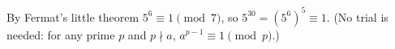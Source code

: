 By Fermat's little theorem $5^6\equiv1\pmod7$, so $5^{30}=(5^6)^5\equiv\boxed{1}$. (No trial is needed: for any prime $p$ and $p\nmid a$, $a^{p-1}\equiv1\pmod p$.)
